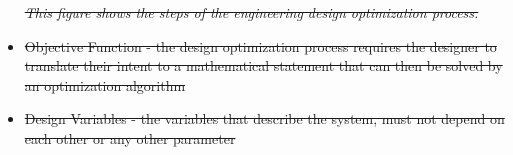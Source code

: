 \documentclass{journal}
\providecommand{\DIFdel}[1]{{\protect\color{red}\sout{#1}}}                      %
\providecommand{\DIFdelend}{} %
\providecommand{\DIFdelFL}[1]{\DIFdel{#1}} %
\DeclareRobustCommand{\DIFdelend}{\DIFOaddend \let\includegraphics\DIFOincludegraphics} %
\begin{document}
\begin{itemize}
{%
\emph{\DIFdelFL{This figure shows the steps of the engineering design optimization process.}}%
}

\item%
\DIFdel{Objective Function - the design optimization process requires the designer to translate their intent to a mathematical statement that can then be solved by an optimization algorithm
		}%
\item%
\DIFdel{Design Variables - the variables that describe the system, must not depend on each other or any other parameter
		}%

\DIFdelend \end{itemize}
\end{document}
